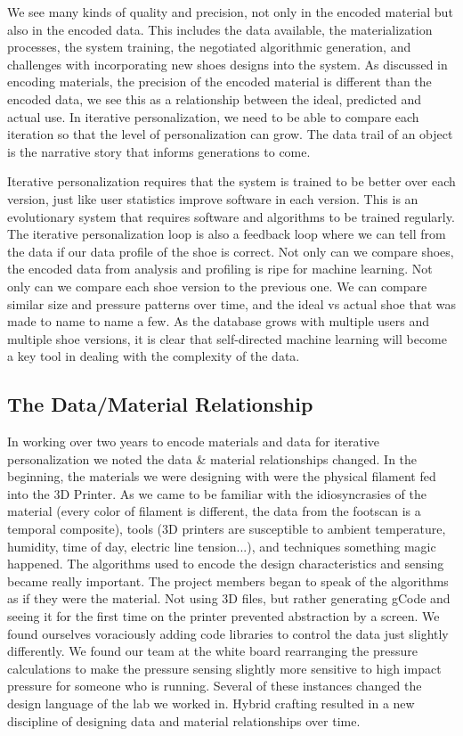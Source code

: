 We see many kinds of quality and precision, not only in the encoded material but also in the encoded data. This includes the data available, the materialization processes, the system training, the negotiated algorithmic generation, and challenges with incorporating new shoes designs into the system. As discussed in encoding materials, the precision of the encoded material is different than the encoded data, we see this as a relationship between the ideal, predicted and actual use. In iterative personalization, we need to be able to compare each iteration so that the level of personalization can grow. The data trail of an object is the narrative story that informs generations to come.  

Iterative personalization requires that the system is trained to be better over each version, just like user statistics improve software in each version. This is an evolutionary system that requires software and algorithms to be trained regularly. The iterative personalization loop is also a feedback loop where we can tell from the data if our data profile of the shoe is correct. Not only can we compare shoes, the encoded data from analysis and profiling is ripe for machine learning. Not only can we compare each shoe version to the previous one. We can compare similar size and pressure patterns over time, and the ideal vs actual shoe that was made to name to name a few. As the database grows with multiple users and multiple shoe versions, it is clear that self-directed machine learning will become a key tool in dealing with the complexity of the data.  

\subsection{The Data/Material Relationship}
In working over two years to encode materials and data for iterative personalization we noted the data \& material relationships changed. In the beginning, the materials we were designing with were the physical filament fed into the 3D Printer. As we came to be familiar with the idiosyncrasies of the material (every color of filament is different, the data from the footscan is a temporal composite), tools (3D printers are susceptible to ambient temperature, humidity, time of day, electric line tension...), and techniques something magic happened. The algorithms used to encode the design characteristics and sensing became really important. The project members began to speak of the algorithms as if they were the material. Not using 3D files, but rather generating gCode and seeing it for the first time on the printer prevented abstraction by a screen. We found ourselves voraciously adding code libraries to control the data just slightly differently. We found our team at the white board rearranging the pressure calculations to make the pressure sensing slightly more sensitive to high impact pressure for someone who is running. Several of these instances changed the design language of the lab we worked in. Hybrid crafting resulted in a new discipline of designing data and material relationships over time. 

